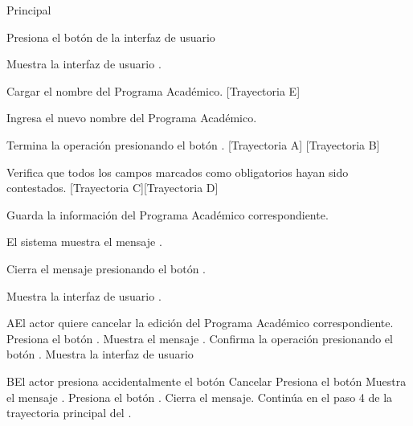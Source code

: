\begin{UCtrayectoria}{Principal}

    \UCpaso[\UCactor] Presiona el botón  de la interfaz de usuario 

    \UCpaso Muestra la interfaz de usuario .
    
    \UCpaso Cargar el nombre del Programa Académico. [Trayectoria E]
    
    \UCpaso[\UCactor] Ingresa el nuevo nombre del Programa Académico.

    \UCpaso[\UCactor] Termina la operación presionando el botón . [Trayectoria A] [Trayectoria B]

    \UCpaso Verifica que todos los campos marcados como obligatorios hayan sido contestados. [Trayectoria C][Trayectoria D]

    \UCpaso Guarda la información del Programa Académico correspondiente.

    \UCpaso El sistema muestra el mensaje .

    \UCpaso[\UCactor] Cierra el mensaje presionando el botón .

    \UCpaso Muestra la interfaz de usuario .
\end{UCtrayectoria}




\begin{UCtrayectoriaA}{A}{El actor quiere cancelar la edición  del Programa Académico correspondiente.}
	\UCpaso[\UCactor] Presiona el botón .
    \UCpaso Muestra el mensaje .
    \UCpaso[\UCactor] Confirma la operación presionando el botón .
    \UCpaso Muestra la interfaz de usuario 
\end{UCtrayectoriaA}



\begin{UCtrayectoriaA}{B}{El actor presiona accidentalmente el botón Cancelar}
	\UCpaso[\UCactor] Presiona el botón 
    \UCpaso Muestra el mensaje .
    \UCpaso[\UCactor] Presiona el botón .
    \UCpaso Cierra el mensaje.
    \UCpaso Continúa en el paso 4 de la trayectoria principal del .
\end{UCtrayectoriaA}

